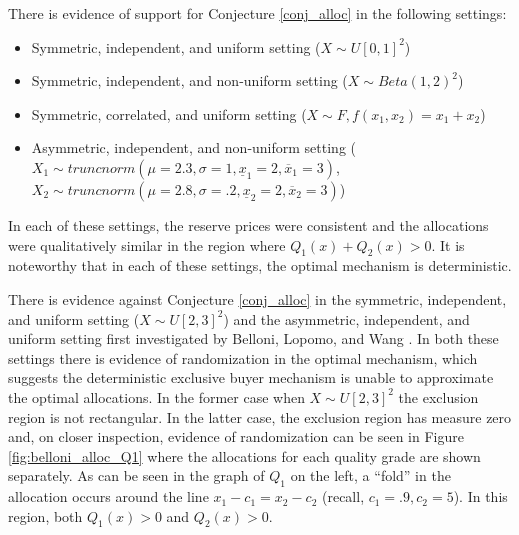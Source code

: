 There is evidence of support for Conjecture \ref{conj_alloc} in the following settings:
\begin{itemize}
    \item Symmetric, independent, and uniform setting ($X \sim U[0,1]^2$)
    \item Symmetric, independent, and non-uniform setting ($X \sim Beta(1,2)^2$)
    \item Symmetric, correlated, and uniform setting ($X \sim F, f(x_1,x_2) = x_1 + x_2$)
    \item Asymmetric, independent, and non-uniform setting ($X_1 \sim truncnorm(\mu=2.3, \sigma=1, \underline{x}_1=2, \overline{x}_1=3)$, $X_2 \sim truncnorm(\mu=2.8, \sigma=.2, \underline{x}_2=2, \overline{x}_2=3)$)
\end{itemize}
\noindent In each of these settings, the reserve prices were consistent and the allocations were qualitatively similar in the region where $Q_1(x) + Q_2(x) > 0$. It is noteworthy that in each of these settings, the optimal mechanism is deterministic. 

There is evidence against Conjecture \ref{conj_alloc} in the symmetric, independent, and uniform setting ($X \sim U[2,3]^2$) and the asymmetric, independent, and uniform setting first investigated by Belloni, Lopomo, and Wang \autocite*{belloni2010multidimensional}. In both these settings there is evidence of randomization in the optimal mechanism, which suggests the deterministic exclusive buyer mechanism is unable to approximate the optimal allocations. In the former case when $X \sim U[2,3]^2$ the exclusion region is not rectangular. In the latter case, the exclusion region has measure zero and, on closer inspection, evidence of randomization can be seen in Figure \ref{fig:belloni_alloc_Q1} where the allocations for each quality grade are shown separately. As can be seen in the graph of $Q_1$ on the left, a ``fold'' in the allocation occurs around the line $x_1 - c_1 = x_2 - c_2$ (recall, $c_1=.9, c_2=5$). In this region, both $Q_1(x) > 0$ and $Q_2(x) > 0$.


